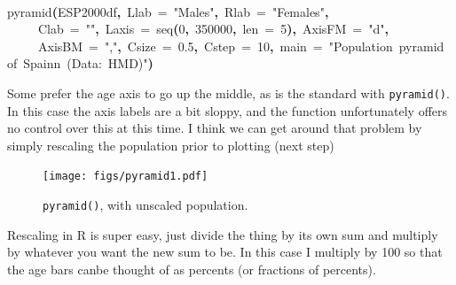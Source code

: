 \documentclass[a4paper]{article}
\newcommand{\hlnumber}[1]{\textcolor[rgb]{0.0823529411764706,0.0784313725490196,0.709803921568627}{#1}}%
\newcommand{\hlfunctioncall}[1]{\textcolor[rgb]{1,0,0}{#1}}%
\newcommand{\hlstring}[1]{\textcolor[rgb]{0.6,0.6,1}{#1}}%
\newcommand{\hlkeyword}[1]{\textcolor[rgb]{0,0,0}{\textbf{#1}}}%
\newcommand{\hlargument}[1]{\textcolor[rgb]{0.694117647058824,0.247058823529412,0.0196078431372549}{#1}}%
\newcommand{\hlsymbol}[1]{\textcolor[rgb]{0,0,0}{#1}}%
\newcommand{\hlprompt}[1]{\textcolor[rgb]{0,0,0}{#1}}%
\newcommand{\hlstd}[1]{\textcolor[rgb]{0,0,0}{#1}}%
\newenvironment{Houtput}{\raggedright}{%
%
}
\begin{document}
\begin{Houtput}
\hspace*{\fill}\\
\hlstd{}\ttfamily\noindent
\hlprompt{\usebox{\hlnormalsizeboxgreaterthan}{\ }}\hlfunctioncall{pyramid}\hlkeyword{(}\hlsymbol{ESP2000df}\hlkeyword{,}{\ }\hlargument{Llab}{\ }\hlargument{=}{\ }\hlstring{"Males"}\hlkeyword{,}{\ }\hlargument{Rlab}{\ }\hlargument{=}{\ }\hlstring{"Females"}\hlkeyword{,}\hspace*{\fill}\\
\hlstd{}\hlprompt{{\ }}{\ }{\ }{\ }{\ }\hlargument{Clab}{\ }\hlargument{=}{\ }\hlstring{""}\hlkeyword{,}{\ }\hlargument{Laxis}{\ }\hlargument{=}{\ }\hlfunctioncall{seq}\hlkeyword{(}\hlnumber{0}\hlkeyword{,}{\ }\hlnumber{350000}\hlkeyword{,}{\ }\hlargument{len}{\ }\hlargument{=}{\ }\hlnumber{5}\hlkeyword{)}\hlkeyword{,}{\ }\hlargument{AxisFM}{\ }\hlargument{=}{\ }\hlstring{"d"}\hlkeyword{,}\hspace*{\fill}\\
\hlstd{}\hlprompt{{\ }}{\ }{\ }{\ }{\ }\hlargument{AxisBM}{\ }\hlargument{=}{\ }\hlstring{","}\hlkeyword{,}{\ }\hlargument{Csize}{\ }\hlargument{=}{\ }\hlnumber{0.5}\hlkeyword{,}{\ }\hlargument{Cstep}{\ }\hlargument{=}{\ }\hlnumber{10}\hlkeyword{,}{\ }\hlargument{main}{\ }\hlargument{=}{\ }\hlstring{"Population{\ }pyramid{\ }of{\ }Spain\usebox{\hlnormalsizeboxbackslash}n{\ }(Data:{\ }HMD)"}\hlkeyword{)}\mbox{}
\normalfont
\hspace*{\fill}\\
\hlstd{}
\end{Houtput}

Some prefer the age axis to go up the middle, as is the standard with \texttt{pyramid()}. In this case the axis labels are a bit sloppy, and the function unfortunately offers no control over this at this time. I think we can get around that problem by simply rescaling the population prior to plotting (next step)



\begin{figure}[H]
\centering
\texttt{[image: figs/pyramid1.pdf]}
\caption{\texttt{pyramid()}, with unscaled population.}
\end{figure}


Rescaling in R is super easy, just divide the thing by its own sum and multiply by whatever you want the new sum to be. In this case I multiply by 100 so that the age bars canbe thought of as percents (or fractions of percents).
\end{document}
